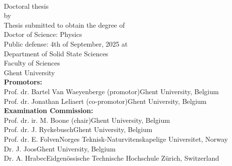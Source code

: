 \thispagestyle{empty}
\noindent

\fontsize{12pt}{14pt}\selectfont

\vspace*{-3cm}
\noindent{}
\vspace{2cm}
\fontsize{22pt}{22pt}\selectfont
\begin{center}
{\textsc{\phdtitle}}\\
\end{center}

\fontsize{14pt}{16pt}\selectfont

\null\hfill Doctoral thesis\\
\null\hfill by \phdauthor\\
\vfill
{}
\fontsize{12pt}{14pt}\selectfont
Thesis submitted to obtain the degree of\\
Doctor of Science: Physics\\
\newline
Public defense: 4th of September, 2025 at\\
Department of Solid State Sciences\\
Faculty of Sciences\\
Ghent University\\


\textbf{Promotors:}\\
Prof. dr. Bartel Van Waeyenberge (promotor)\hfill Ghent University, Belgium\\
Prof. dr. Jonathan Leliaert (co-promotor)\hfill Ghent University, Belgium\\
\newline
\textbf{Examination Commission:}\\
Prof. dr. ir. M. Boone (chair)\hfill Ghent University, Belgium\\
Prof. dr. J. Ryckebusch\hfill Ghent University, Belgium\\
Prof. dr. E. Folven\hfill Norges Teknisk-Naturvitenskapelige Universitet, Norway\\%
Dr. J. Joos\hfill Ghent University, Belgium\\
Dr. A. Hrabec\hfill Eidgen\"ossische Technische Hochschule Z\"urich, Switzerland\\%

\newpage
